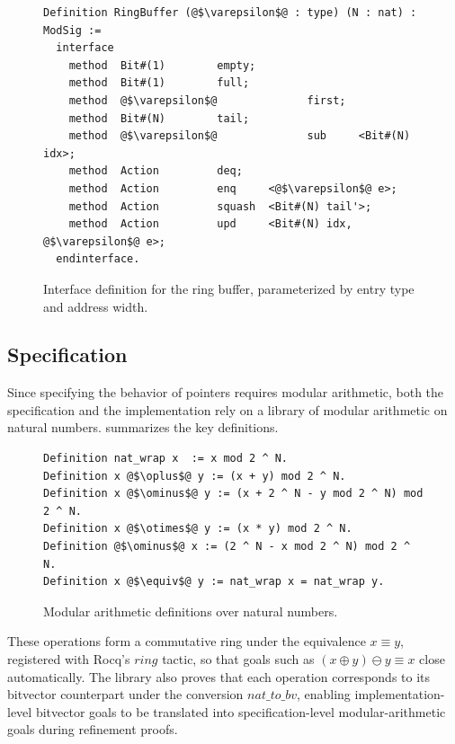 \documentclass[fontset=fira-newtxsf]{mitthesis}
\theoremstyle{definition}
\theoremstyle{plain}
\begin{document}
\begin{figure}[H]
\begin{verbatim}
Definition RingBuffer (@$\varepsilon$@ : type) (N : nat) : ModSig :=
  interface
    method  Bit#(1)        empty;
    method  Bit#(1)        full;
    method  @$\varepsilon$@              first;
    method  Bit#(N)        tail;
    method  @$\varepsilon$@              sub     <Bit#(N) idx>;
    method  Action         deq;
    method  Action         enq     <@$\varepsilon$@ e>;
    method  Action         squash  <Bit#(N) tail'>;
    method  Action         upd     <Bit#(N) idx, @$\varepsilon$@ e>;
  endinterface.
\end{verbatim}
\caption[Ring-buffer interface]{Interface definition for the ring buffer, parameterized by entry type and address width.}
\label{fig:rb-intf}
\end{figure}

\subsection{Specification}

Since specifying the behavior of pointers requires modular arithmetic, both the specification and the implementation rely on a library of modular arithmetic on natural numbers.
 summarizes the key definitions.

\begin{figure}[ht]
\begin{verbatim}
Definition nat_wrap x  := x mod 2 ^ N.
Definition x @$\oplus$@ y := (x + y) mod 2 ^ N.
Definition x @$\ominus$@ y := (x + 2 ^ N - y mod 2 ^ N) mod 2 ^ N.
Definition x @$\otimes$@ y := (x * y) mod 2 ^ N.
Definition @$\ominus$@ x := (2 ^ N - x mod 2 ^ N) mod 2 ^ N.
Definition x @$\equiv$@ y := nat_wrap x = nat_wrap y.
\end{verbatim}
\caption[Modular-arithmetic over naturals]{Modular arithmetic definitions over natural numbers.}
\label{fig:rb-nat-ring}
\end{figure}

These operations form a commutative ring under the equivalence $x \equiv y$, registered with Rocq's $\mathit{ring}$ tactic, so that goals such as $(x \oplus y) \ominus y \equiv x$ close automatically.
The library also proves that each operation corresponds to its bitvector counterpart under the conversion $\mathit{nat\_to\_bv}$, enabling implementation-level bitvector goals to be translated into specification-level modular-arithmetic goals during refinement proofs.
\end{document}
